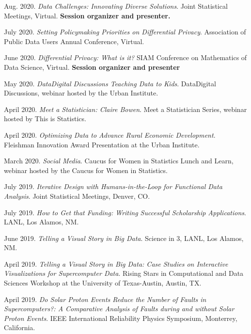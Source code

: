 \begin{etaremune}[topsep=0pt, itemsep=4pt, partopsep=0pt, parsep=0pt]
    \item Aug. 2020. \textit{Data Challenges: Innovating Diverse Solutions}. Joint Statistical Meetings, Virtual. \textbf{Session organizer and presenter.}
    
    \item July 2020. \textit{Setting Policymaking Priorities on Differential Privacy}. Association of Public Data Users Annual Conference, Virtual.
    
    \item June 2020. \textit{Differential Privacy: What is it?} SIAM Conference on Mathematics of Data Science, Virtual. \textbf{Session organizer and presenter}
    
    \item May 2020. \textit{Data\@Urban Digital Discussions Teaching Data to Kids}. Data\@Urban Digital Discussions, webinar hosted by the Urban Institute.
    
    \item April 2020. \textit{Meet a Statistician: Claire Bowen}. Meet a Statistician Series, webinar hosted by This is Statistics.
    
    \item April 2020. \textit{Optimizing Data to Advance Rural Economic Development}. Fleishman Innovation Award Presentation at the Urban Institute.
    
    \item March 2020. \textit{Social Media}. Caucus for Women in Statistics Lunch and Learn, webinar hosted by the Caucus for Women in Statistics.
    
    \item July 2019. \textit{Iterative Design with Humans-in-the-Loop for Functional Data Analysis}. Joint Statistical Meetings, Denver, CO. 
    
    \item July 2019. \textit{How to Get that Funding: Writing Successful Scholarship Applications}. LANL, Los Alamos, NM.
    
    \item June 2019. \textit{Telling a Visual Story in Big Data}. Science in 3, LANL, Los Alamos, NM. 
    
    \item April 2019. \textit{Telling a Visual Story in Big Data: Case Studies on Interactive Visualizations for Supercomputer Data}. Rising Stars in Computational and Data Sciences Workshop at the University of Texas-Austin, Austin, TX.
    
    \item April 2019. \textit{Do Solar Proton Events Reduce the Number of Faults in Supercomputers?: A Comparative Analysis of Faults during and without Solar Proton Events}. IEEE International Reliability Physics Symposium, Monterrey, California.
    

\end{etaremune}
